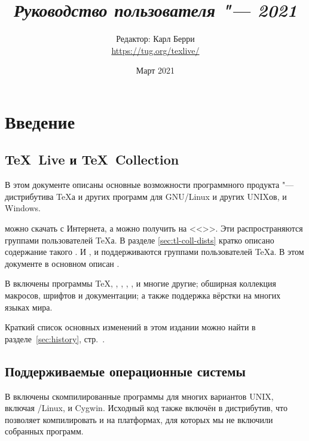 \documentclass{article}
\def\p.{стр.~}%
\begin{document}
\title{%
  {\huge \textit{Руководство пользователя \protect\TL{} "--- 2021}}%
}

\author{Редактор: Карл Берри\\[3mm]
        \url{https://tug.org/texlive/}}
\date{Март 2021}

\maketitle


\begin{multicols}{2}
\tableofcontents
\end{multicols}

\section{Введение}
\label{sec:intro}

\subsection{\protect\TeX\ Live и \protect\TeX\ Collection}


В этом документе описаны основные возможности программного продукта
\TL{} "--- дистрибутива \TeX{}а и других программ для
GNU/Linux и других UNIXов, \MacOSX и  Windows.

\TL{} можно скачать с Интернета, а можно получить на \DVD{} <<\TK{}>>.  Эти
\DVD{} распространяются группами пользователей \TeX а.  В разделе
\ref{sec:tl-coll-dists} кратко описано содержание такого \DVD{}.  И
\TL{}, и \TK{} поддерживаются группами пользователей \TeX а.  В этом
документе в основном описан \TL{}. 

В \TL{} включены программы \TeX{}, \LaTeXe{}, \ConTeXt, \MF, \MP,
\BibTeX{} и многие другие; обширная коллекция макросов, шрифтов и
документации; а также поддержка вёрстки на многих языках мира.


Краткий список основных изменений в этом издании \TeXLive{} можно
найти в разделе~\ref{sec:history}, \p.\pageref{sec:history}.

\subsection{Поддерживаемые операционные системы}
\label{sec:os-support}

В \TL{} включены скомпилированные программы для многих вариантов UNIX,
включая \GNU/Linux, \MacOSX{} и Cygwin.  Исходный код также включён в
дистрибутив, что позволяет компилировать \TL{} и на платформах, для
которых мы не включили собранных программ.
\end{document}
